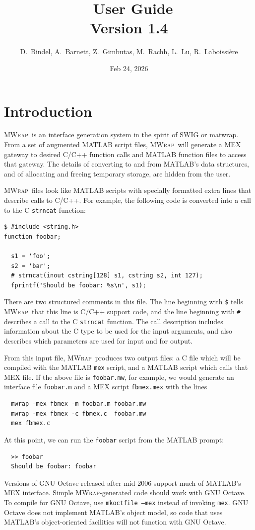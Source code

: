 \documentclass[12pt]{article}
\title{\mwrap\ User Guide\\ Version 1.4}
\author{D.~Bindel, A.~Barnett, Z.~Gimbutas, M.~Rachh, L.~Lu, R.~Laboissi\`ere}
\date{Feb 24, 2026}
\newcommand{\mwrap}{\textsc{MWrap}}
\begin{document}
\maketitle

\section{Introduction}

\mwrap\ is an interface generation system in the spirit of SWIG or
matwrap.  From a set of augmented MATLAB script files, \mwrap\ will
generate a MEX gateway to desired C/C++ function calls and MATLAB
function files to access that gateway.  The details of converting to
and from MATLAB's data structures, and of allocating and freeing
temporary storage, are hidden from the user.

\mwrap\ files look like MATLAB scripts with specially formatted
extra lines that describe calls to C/C++.  For example, the following
code is converted into a call to the C {\tt strncat} function:
\begin{verbatim}
$ #include <string.h>
function foobar;

  s1 = 'foo';
  s2 = 'bar';
  # strncat(inout cstring[128] s1, cstring s2, int 127);
  fprintf('Should be foobar: %s\n', s1);
\end{verbatim}
There are two structured comments in this file.  The line
beginning with \verb|$| tells \mwrap\ that this line is C/C++
support code, and the line beginning with \verb|#| describes
a call to the C {\tt strncat} function.  The call description
includes information about the C type to be used for the input
arguments, and also describes which parameters are used for input
and for output.

From this input file, \mwrap\ produces two output files: a C file
which will be compiled with the MATLAB {\tt mex} script, and a MATLAB
script which calls that MEX file.  If the above file is {\tt foobar.mw},
for example, we would generate an interface file {\tt foobar.m} and a
MEX script {\tt fbmex.mex} with the lines
\begin{verbatim}
  mwrap -mex fbmex -m foobar.m foobar.mw
  mwrap -mex fbmex -c fbmex.c  foobar.mw
  mex fbmex.c
\end{verbatim}
At this point, we can run the {\tt foobar} script from the MATLAB prompt:
\begin{verbatim}
  >> foobar
  Should be foobar: foobar
\end{verbatim}

Versions of GNU Octave released after mid-2006 support much of
MATLAB's MEX interface.  Simple {\mwrap}-generated code should work
with GNU Octave.  To compile for GNU Octave, use \texttt{mkoctfile
  --mex} instead of invoking \texttt{mex}.  GNU Octave does not
implement MATLAB's object model, so code that uses MATLAB's
object-oriented facilities will not function with GNU Octave.
\end{document}
